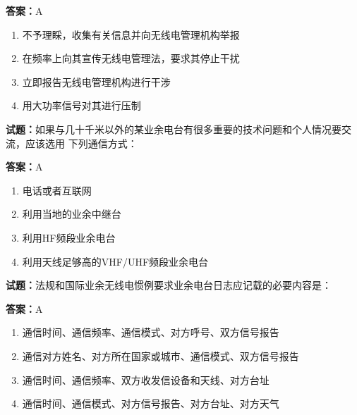 \documentclass{ctexbook}
\begin{document}
\textbf{答案：}A 

\begin{enumerate}[leftmargin=3em]
  \item 不予理睬，收集有关信息并向无线电管理机构举报 

  \item 在频率上向其宣传无线电管理法，要求其停止干扰 

  \item 立即报告无线电管理机构进行干涉 

  \item 用大功率信号对其进行压制 

\end{enumerate}





\vspace{1em}

\textbf{试题：}如果与几十千米以外的某业余电台有很多重要的技术问题和个人情况要交流，应该选用
下列通信方式： 

\textbf{答案：}A 

\begin{enumerate}[leftmargin=3em]
  \item 电话或者互联网 

  \item 利用当地的业余中继台 

  \item 利用HF频段业余电台 

  \item 利用天线足够高的VHF/UHF频段业余电台 

\end{enumerate}





\vspace{1em}

\textbf{试题：}法规和国际业余无线电惯例要求业余电台日志应记载的必要内容是： 

\textbf{答案：}A 

\begin{enumerate}[leftmargin=3em]
  \item 通信时间、通信频率、通信模式、对方呼号、双方信号报告 

  \item 通信对方姓名、对方所在国家或城市、通信模式、双方信号报告 


  \item 通信时间、通信频率、双方收发信设备和天线、对方台址 

  \item 通信时间、通信模式、对方信号报告、对方台址、对方天气 

\end{enumerate}
\end{document}

